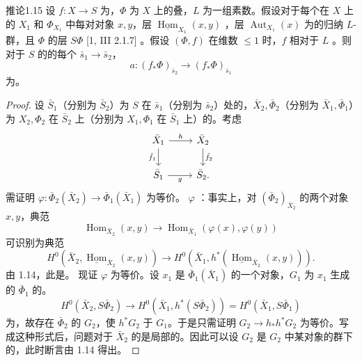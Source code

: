 \begin{SGAresult}{推论}{1.15}
设 $f:X\to S$ 为，$\Phi$ 为 $X$ 上的叠，$L$ 为一组素数。假设对于每个在 $X$ 上的 $X_1$ 和 $\Phi_{X_1}$ 中每对对象 $x,y$，层 $\underline{\operatorname{Hom}}_{X_1}(x,y)$ ，层 $\operatorname{Aut}_{X_1}(x)$ 为的归纳 $L$-群，且 $\Phi$ 的层 $S\Phi$ [1, III 2.1.7] 。假设 $(\Phi,f)$ 在维数 $\leqslant1$ 时，$f$ 相对于 $L$ 。则对于 $S$ 的的每个 $\bar s_1\to\bar s_2$，
\[a:(f_*\Phi)_{\bar s_2}\longrightarrow(f_*\Phi)_{\bar s_1}\]
为。
\end{SGAresult}
\begin{proof}
设 $\bar S_1$（分别为 $\bar S_2$）为 $S$ 在 $\bar s_1$（分别为 $\bar s_2$）处的，$\bar X_2,\bar\Phi_2$（分别为 $\bar X_1,\bar\Phi_1$）为 $X_2,\Phi_2$ 在 $\bar S_2$ 上（分别为 $X_1,\Phi_1$ 在 $\bar S_1$ 上）的。考虑
\[
\begin{tikzcd}
\bar X_1\arrow[r,"h"]\arrow[d,"\bar f_1"']&\bar X_2\arrow[d,"\bar f_2"]\\
\bar S_1\arrow[r,"g"']&\bar S_2.
\end{tikzcd}
\]
需证明 $\varphi:\bar\Phi_2(\bar X_2)\to\bar\Phi_1(\bar X_1)$ 为等价。 $\varphi$ ：事实上，对 $(\bar\Phi_2)_{\bar X_2}$ 的两个对象 $x,y$，典范
\[\operatorname{Hom}_{\bar X_2}(x,y)\longrightarrow\operatorname{Hom}_{\bar X_1}(\varphi(x),\varphi(y))\]
可识别为典范
\[H^0(\bar X_2,\underline{\operatorname{Hom}}_{\bar X_2}(x,y))\longrightarrow H^0(\bar X_1,h^*(\underline{\operatorname{Hom}}_{\bar X_2}(x,y))).\]
由 1.14，此是。
现证 $\varphi$ 为等价。设 $x_1$ 是 $\bar\Phi_1(\bar X_1)$ 的一个对象，$G_1$ 为 $x_1$ 生成的 $\bar\Phi_1$ 的。
\[H^0(\bar X_2,S\bar\Phi_2)\longrightarrow H^0(\bar X_1,h^*(S\bar\Phi_2))=H^0(\bar X_1,S\bar\Phi_1)\]
为，故存在 $\bar\Phi_2$ 的 $G_2$，使 $h^*G_2$ 于 $G_1$。于是只需证明 $G_2\to h_*h^*G_2$ 为等价。写成这种形式后，问题对于 $\bar X_2$ 的是局部的。因此可以设 $G_2$ 是 $G_2$ 中某对象的群下的，此时断言由 1.14 得出。
\end{proof}

